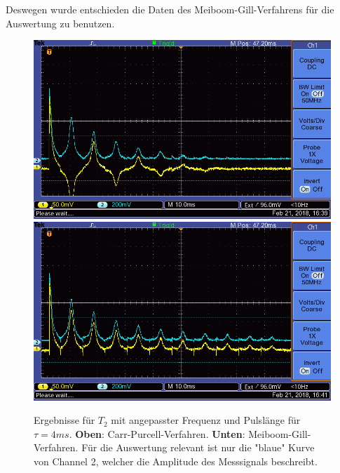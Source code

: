 \documentclass[12pt,a4paper]{article}
\begin{document}
Deswegen wurde entschieden die Daten des Meiboom-Gill-Verfahrens für die Auswertung zu benutzen.
\begin{figure}
\centering
\includegraphics[scale=0.8]{Bilder/T2CPalt.png}
\includegraphics[scale=0.8]{Bilder/T2MGalt.png}
\caption{Ergebnisse für $T_2$ mit angepasster Frequenz und Pulslänge für $\tau = 4ms$. \textbf{Oben}: Carr-Purcell-Verfahren. \textbf{Unten}: Meiboom-Gill-Verfahren. Für die Auswertung relevant ist nur die "blaue" Kurve von Channel 2, welcher die Amplitude des Messsignals beschreibt.}
\label{fig:T2Datenalt}
\end{figure}
\end{document}
